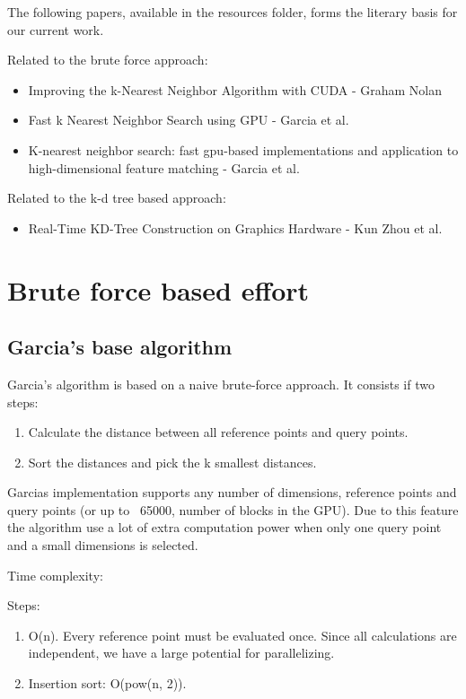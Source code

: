 The following papers, available in the resources folder, forms the literary basis for our current work.

Related to the brute force approach:
\begin{itemize}
    \item Improving the k-Nearest Neighbor Algorithm with CUDA - Graham Nolan
    \item Fast k Nearest Neighbor Search using GPU - Garcia et al.
    \item K-nearest neighbor search: fast gpu-based implementations and application to high-dimensional feature matching - Garcia et al.
\end{itemize}

Related to the k-d tree based approach:
\begin{itemize}
    \item Real-Time KD-Tree Construction on Graphics Hardware - Kun Zhou et al.
\end{itemize}


\section{Brute force based effort} %
\label{sub:brute_force_based_effort}

\subsection{Garcia's base algorithm} %
\label{ssub:garcias_base_algorithme}

Garcia's algorithm is based on a naive brute-force approach. It consists if two steps:
\begin{enumerate}
    \item Calculate the distance between all reference points and query points.
    \item Sort the distances and pick the k smallest distances.
\end{enumerate}

Garcias implementation supports any number of dimensions, reference points and query points (or up to ~65000, number of blocks in the GPU). Due to this feature the algorithm use a lot of extra computation power when only one query point and a small dimensions is selected.

Time complexity:

Steps:

\begin{enumerate}
    \item O(n). Every reference point must be evaluated once. Since all calculations are independent, we have a large potential for parallelizing.
    \item Insertion sort: O(pow(n, 2)).
\end{enumerate}

